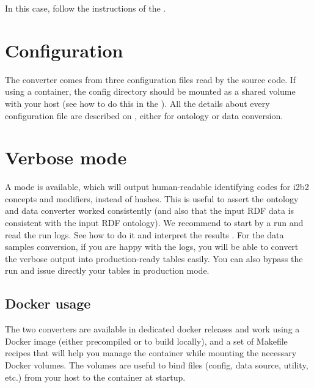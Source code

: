 \documentclass[letterpaper,10pt,english]{sphinxmanual}
\begin{document}
In this case, follow the instructions of the {\hyperref[\detokenize{installation:installation}]{}}.


\chapter{Configuration}
\label{\detokenize{index:configuration}}
The converter comes from three configuration files read by the source code. If using a container, the config directory should be mounted as a shared volume with your host (see how to do this in the {\hyperref[\detokenize{docker:makefile}]{}}).
All the details about every configuration file are described on {\hyperref[\detokenize{configuration:configuration}]{}}, either for ontology or data conversion.


\chapter{Verbose mode}
\label{\detokenize{index:verbose-mode}}
A  mode is available, which will output human-readable identifying codes for i2b2 concepts and modifiers, instead of hashes. This is useful to assert the ontology and data converter worked consistently (and also that the input RDF data is consistent with the input RDF ontology).
We recommend to start by a  run and read the run logs. See how to do it and interpret the results {\hyperref[\detokenize{verbose:verbose}]{}}. For the data samples conversion, if you are happy with the logs, you will be able to convert the verbose output into production-ready tables easily.
You can also bypass the  run and issue directly your tables in production mode.


\section{Docker usage}
\label{\detokenize{docker:docker-usage}}\label{\detokenize{docker:docker}}\label{\detokenize{docker::doc}}
The two converters are available in dedicated docker releases and work using a Docker image (either precompiled or to build locally), and a set of Makefile recipes that will help you manage the container while mounting the necessary Docker volumes. The volumes are useful to bind files (config, data source, utility, etc.) from your host to the container at startup.
\end{document}
